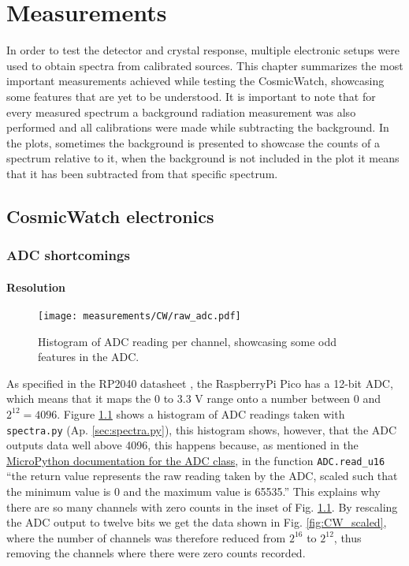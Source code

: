 \chapter{Measurements}\label{chap:measurements}

In order to test the detector and crystal response, multiple electronic setups were used to obtain spectra from calibrated sources. This chapter summarizes the most important measurements achieved while testing the CosmicWatch, showcasing some features that are yet to be understood. It is important to note that for every measured spectrum a background radiation measurement was also performed and all calibrations were made while subtracting the background. In the plots, sometimes the background is presented to showcase the counts of a spectrum relative to it, when the background is not included in the plot it means that it has been subtracted from that specific spectrum.

\section{CosmicWatch electronics}

\subsection{ADC shortcomings}\label{sec:ADC_shortcomings}

\subsubsection{Resolution}

\begin{figure}
  \centering
  \texttt{[image: measurements/CW/raw\_adc.pdf]}
  \caption{\label{fig:CW_raw}Histogram of ADC reading per channel, showcasing some odd features in the ADC.}
\end{figure}

As specified in the RP2040 datasheet \cite[sec.~4.9]{datasheet2024rp2040}, the RaspberryPi Pico has a 12-bit ADC, which means that it maps the 0 to 3.3 \unit{\V} range onto a number between 0 and $2^{12}=4096$. Figure \ref{fig:CW_raw} shows a histogram of ADC readings taken with \texttt{spectra.py} (Ap. \ref{sec:spectra.py}), this histogram shows, however, that the ADC outputs data well above 4096, this happens because, as mentioned in the \href{https://docs.micropython.org/en/latest/library/machine.ADC.html#machine.ADC}{MicroPython documentation for the ADC class}, in the function \texttt{ADC.read\_u16} ``the return value represents the raw reading taken by the ADC, scaled such that the minimum value is 0 and the maximum value is 65535.'' This explains why there are so many channels with zero counts in the inset of Fig. \ref{fig:CW_raw}. By rescaling the ADC output to twelve bits we get the data shown in Fig. \ref{fig:CW_scaled}, where the number of channels was therefore reduced from $2^{16}$ to $2^{12}$, thus removing the channels where there were zero counts recorded.

